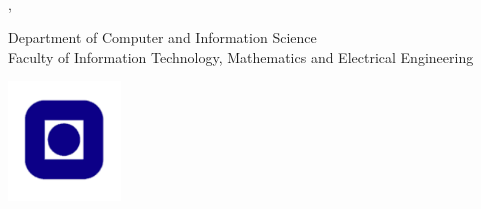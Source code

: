 \clearpage
\begin{titlepage}
    \noindent {\large \bf \thesisAuthor}
    \vspace{1.5cm}
    
    \noindent \raggedright {\Huge \thesisTitle} \\
    \noindent {\Large \it \thesisSubTitle}
    \vspace{2cm}
    
    \noindent \thesisType, \thesisDate 
    \vspace{2cm}
    
    \noindent Department of Computer and Information Science\\ Faculty of Information Technology, Mathematics and Electrical Engineering\\
    
    \vfill
    \begin{center}
    \includegraphics[width=3cm]{fig/NTNUlogo.pdf}
    \end{center}
\end{titlepage}
\cleardoublepage
%
%
%
%
%
